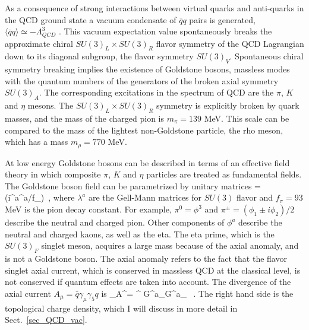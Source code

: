  As a consequence of strong interactions between virtual quarks and 
anti-quarks in the QCD ground state a vacuum condensate of $\bar{q}q$ 
pairs is generated, $\langle\bar{q}q\rangle\simeq-\Lambda^3_{QCD}$
\cite{GellMann:1968rz,Coleman:1980mx,tHooft:1979bh}. This vacuum 
expectation value spontaneously breaks the approximate chiral $SU(3)_L
\times SU(3)_R$ flavor symmetry of the QCD Lagrangian down to its 
diagonal subgroup, the flavor symmetry $SU(3)_V$. Spontaneous chiral 
symmetry breaking implies the existence of Goldstone bosons, massless 
modes with the quantum numbers of the generators of the broken axial 
symmetry $SU(3)_A$. The corresponding excitations in the spectrum
of QCD are the $\pi$, $K$ and $\eta$ mesons. The $SU(3)_L\times SU(3)_R$ 
symmetry is explicitly broken by quark masses, and the mass of the 
charged pion is $m_\pi=139$ MeV. This scale can be compared to the 
mass of the lightest non-Goldstone particle, the rho meson, which 
has a mass $m_\rho=770$ MeV.

 At low energy Goldstone bosons can be described in terms of 
an effective field theory in which composite $\pi$, $K$ and 
$\eta$ particles are treated as fundamental fields. The Goldstone 
boson field can be parametrized by unitary matrices 
\be
\Sigma = \exp(i\lambda^a\phi^a/f_\pi)\, , 
\ee
where $\lambda^a$ are the Gell-Mann matrices for $SU(3)$ flavor 
and $f_\pi=93$ MeV is the pion decay constant. For example, $\pi^0=\phi^3$ 
and $\pi^\pm=(\phi_1\pm i\phi_2)/2$ describe the neutral and charged pion. 
Other components of $\phi^a$ describe the neutral and charged kaons, as 
well as the eta. The eta prime, which is the $SU(3)_F$ singlet meson,
acquires a large mass because of the axial anomaly, and is not a Goldstone 
boson. The axial anomaly refers to the fact that the flavor singlet
axial current, which is conserved in massless QCD at the classical
level, is not conserved if quantum effects are taken into account. The
divergence of the axial current $A_\mu=\bar{q}\gamma_\mu\gamma_5 q$ is 
\be 
\partial_\mu A^\mu =  
\epsilon^{\mu\nu\alpha\beta}
      G^a_{\mu\nu}G^a_{\alpha\beta} \, . 
\ee
The right hand side is the topological charge density, which I will
discuss in more detail in Sect.~\ref{sec_QCD_vac}.

